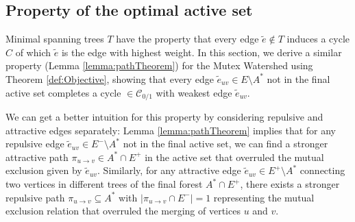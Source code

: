 
\subsection{Property of the optimal active set}\label{subsec:property_active_set}

Minimal spanning trees $T$ have the property that every edge $\tilde{e} \notin T$ induces a cycle $C$ of which $\tilde{e}$ is the edge with highest weight.
In this section, we derive a similar property (Lemma \ref{lemma:pathTheorem}) for the Mutex Watershed using Theorem \ref{def:Objective}, showing that every edge $\tilde{e}_{uv} \in E\setminus A^*$ not in the final active set completes a cycle $\in \mathcal{C}_{0/1}$ with weakest edge $\tilde{e}_{uv}$.

\noindent 
We can get a better intuition for this property by considering repulsive and attractive edges separately: Lemma \ref{lemma:pathTheorem} implies that for any repulsive edge $\tilde{e}_{uv} \in  E^-\setminus A^*$ not in the final active set, we can find a stronger attractive path $ \pi_{u \rightarrow v} \in A^* \cap E^+$ in the active set that overruled the mutual exclusion given by $\tilde{e}_{uv}$. Similarly, for any attractive edge $\tilde{e}_{uv} \in  E^+\setminus A^*$ connecting two vertices in different trees of the final forest $A^* \cap E^+$, there exists a stronger repulsive path $\pi_{u \rightarrow v} \subseteq A^*$ with $|\pi_{u \rightarrow v} \cap E^-| = 1$ representing the mutual exclusion relation that overruled the merging of vertices $u$ and $v$.

